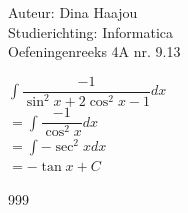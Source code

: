 \documentclass[a4paper]{article}
\begin{document}
   

\noindent \large Auteur: Dina Haajou \\
\noindent \large Studierichting: Informatica\\
\noindent \large Oefeningenreeks 4A nr. 9.13\\

\medskip
\normalsize

$ \displaystyle\int \dfrac{-1}{\sin^2 x + 2\cos^2 x - 1} dx $ \\

$= \displaystyle\int \dfrac{-1}{\cos^2 x} dx$ \\

$= \displaystyle\int -\sec^2 x dx$ \\

$= -\tan x + C$ \\

\begin{thebibliography}{999}
\end{thebibliography}
\end{document}
